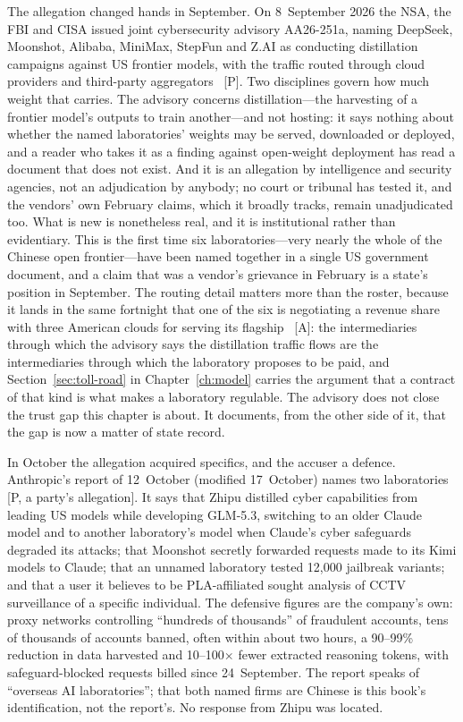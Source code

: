 The allegation changed hands in September. On 8~September 2026 the NSA, the FBI and CISA issued joint cybersecurity advisory AA26-251a, naming DeepSeek, Moonshot, Alibaba, MiniMax, StepFun and Z.AI as conducting distillation campaigns against US frontier models, with the traffic routed through cloud providers and third-party aggregators~\cite{cisa-distillation} [P]. Two disciplines govern how much weight that carries. The advisory concerns distillation---the harvesting of a frontier model's outputs to train another---and not hosting: it says nothing about whether the named laboratories' weights may be served, downloaded or deployed, and a reader who takes it as a finding against open-weight deployment has read a document that does not exist. And it is an allegation by intelligence and security agencies, not an adjudication by anybody; no court or tribunal has tested it, and the vendors' own February claims, which it broadly tracks, remain unadjudicated too. What is new is nonetheless real, and it is institutional rather than evidentiary. This is the first time six laboratories---very nearly the whole of the Chinese open frontier---have been named together in a single US government document, and a claim that was a vendor's grievance in February is a state's position in September. The routing detail matters more than the roster, because it lands in the same fortnight that one of the six is negotiating a revenue share with three American clouds for serving its flagship~\cite{moonshot-cloud-talks} [A]: the intermediaries through which the advisory says the distillation traffic flows are the intermediaries through which the laboratory proposes to be paid, and Section~\ref{sec:toll-road} in Chapter~\ref{ch:model} carries the argument that a contract of that kind is what makes a laboratory regulable. The advisory does not close the trust gap this chapter is about. It documents, from the other side of it, that the gap is now a matter of state record.

In October the allegation acquired specifics, and the accuser a defence. Anthropic's report of 12~October (modified 17~October) names two laboratories~\cite{mdl-anthropic-distill-oct} [P, a party's allegation]. It says that Zhipu distilled cyber capabilities from leading US models while developing GLM-5.3, switching to an older Claude model and to another laboratory's model when Claude's cyber safeguards degraded its attacks; that Moonshot secretly forwarded requests made to its Kimi models to Claude; that an unnamed laboratory tested 12{,}000 jailbreak variants; and that a user it believes to be PLA-affiliated sought analysis of CCTV surveillance of a specific individual. The defensive figures are the company's own: proxy networks controlling ``hundreds of thousands'' of fraudulent accounts, tens of thousands of accounts banned, often within about two hours, a 90--99\% reduction in data harvested and 10--100$\times$ fewer extracted reasoning tokens, with safeguard-blocked requests billed since 24~September. The report speaks of ``overseas AI laboratories''; that both named firms are Chinese is this book's identification, not the report's. No response from Zhipu was located.

